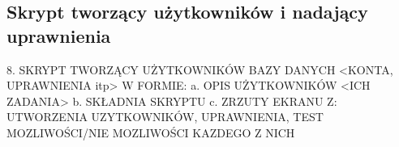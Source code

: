 \subsection{Skrypt tworzący użytkowników i nadający uprawnienia}


8. SKRYPT TWORZĄCY UŻYTKOWNIKÓW BAZY DANYCH <KONTA, UPRAWNIENIA itp>
W FORMIE:
a. OPIS UŻYTKOWNIKÓW <ICH ZADANIA>
b. SKŁADNIA SKRYPTU
c. ZRZUTY EKRANU Z: UTWORZENIA UZYTKOWNIKÓW, UPRAWNIENIA, TEST
MOZLIWOŚCI/NIE MOZLIWOŚCI KAZDEGO Z NICH